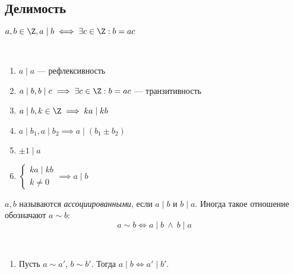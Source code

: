 \subsection{Делимость}

\begin{defn}
    $a, b \in \Z, a \mid b \iff \exists c \in \Z: b = ac$
\end{defn}

\begin{prop}~

    \begin{enumerate}
        \item $a \mid a$ --- рефлексивность
        
        \item $a \mid b, b \mid c \implies \exists c \in \Z: b = ac$ --- транзитивность
        
        \item $a \mid b, k \in \Z \implies ka \mid kb$ 
        
        \item $a \mid b_1, a \mid b_2 \implies a \mid (b_1 \pm b_2)$
        
        \item $\pm1 \mid a$
        
        \item $\begin{cases} ka \mid kb \\ k \neq 0 \end{cases} \implies a \mid b$
    \end{enumerate}
\end{prop}


\begin{defn}
    $a, b$ называются \emph{ассоциированными}, если $a \mid b$ и $b \mid a$.
    Иногда такое отношение обозначают $a \sim b$:
    \[ a \sim b \iff a \mid b \ \wedge\ b \mid a \]
\end{defn}

\begin{prop}~
    \begin{enumerate}
        \item Пусть $a \sim a'$, $ b \sim b'$. Тогда $a \mid b \iff a' \mid b'$.
    \end{enumerate}
\end{prop}